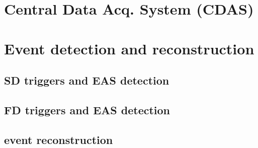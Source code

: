 \section{Central Data Acq. System (CDAS)}
\label{sec:cdas}

\section{Event detection and reconstruction}
\label{sec:event-reconstruction}

\subsection{SD triggers and EAS detection}
\label{ssec:sd-triggers}

\subsection{FD triggers and EAS detection}
\label{ssec:fd-triggers}

\subsection{\Offline event reconstruction}
\label{ssec:offline-event-reconstruction}



